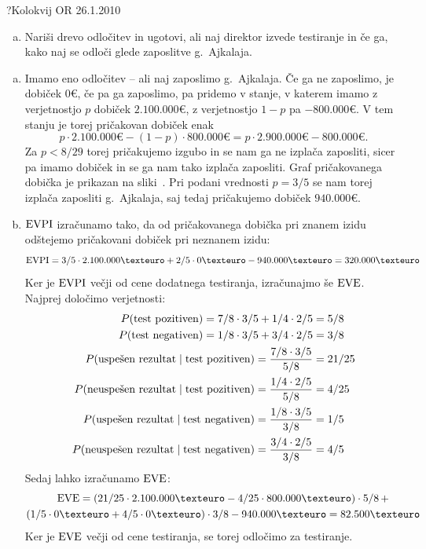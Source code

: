 \begin{naloga}{?}{Kolokvij OR 26.1.2010}
\begin{vprasanje}[ajkalaj]
\begin{enumerate}[(a)]
\item Nariši drevo odločitev in ugotovi,
ali naj direktor izvede testiranje in če ga,
kako naj se odloči glede zaposlitve g.~Ajkalaja.
\end{enumerate}
\end{vprasanje}

\begin{odgovor}
\begin{enumerate}[(a)]
\item Imamo eno odločitev -- ali naj zaposlimo g.~Ajkalaja.
Če ga ne zaposlimo, je dobiček $0 €$,
če pa ga zaposlimo, pa pridemo v stanje,
v katerem imamo z verjetnostjo $p$ dobiček $2.100.000 €$,
z verjetnostjo $1-p$ pa $-800.000 €$.
V tem stanju je torej pričakovan dobiček enak
$$
p \cdot 2.100.000 € - (1-p) \cdot 800.000 € =
p \cdot 2.900.000 € - 800.000 € .
$$
Za $p < 8/29$ torej pričakujemo izgubo in se nam ga ne izplača zaposliti,
sicer pa imamo dobiček in se ga nam tako izplača zaposliti.
Graf pričakovanega dobička je prikazan na sliki~.
Pri podani vrednosti $p = 3/5$ se nam torej izplača zaposliti g.~Ajkalaja,
saj tedaj pričakujemo dobiček $940.000 €$.

\item $\operatorname{EVPI}$ izračunamo tako,
da od pričakovanega dobička pri znanem izidu
odštejemo pričakovani dobiček pri neznanem izidu:
$$
\EVPI = 3/5 \cdot 2.100.000 € + 2/5 \cdot 0€ - 940.000 € = 320.000 €
$$
Ker je $\operatorname{EVPI}$ večji od cene dodatnega testiranja,
izračunajmo še $\operatorname{EVE}$.
Najprej določimo verjetnosti:
\begin{align*}
P(\text{test pozitiven}) = 7/8 \cdot 3/5 + 1/4 \cdot 2/5 &= 5/8 \\
P(\text{test negativen}) = 1/8 \cdot 3/5 + 3/4 \cdot 2/5 &= 3/8 \\
P(\text{uspešen rezultat} \;|\; \text{test pozitiven}) =
{7/8 \cdot 3/5 \over 5/8} &= 21/25 \\
P(\text{neuspešen rezultat} \;|\; \text{test pozitiven}) =
{1/4 \cdot 2/5 \over 5/8} &= 4/25 \\
P(\text{uspešen rezultat} \;|\; \text{test negativen}) =
{1/8 \cdot 3/5 \over 3/8} &= 1/5 \\
P(\text{neuspešen rezultat} \;|\; \text{test negativen}) =
{3/4 \cdot 2/5 \over 3/8} &= 4/5
\end{align*}
Sedaj lahko izračunamo $\operatorname{EVE}$:
\begin{multline*}
\EVE = (21/25 \cdot 2.100.000 € - 4/25 \cdot 800.000 €) \cdot 5/8 \, + \\
(1/5 \cdot 0 € + 4/5 \cdot 0 €) \cdot 3/8 - 940.000 € = 82.500 €
\end{multline*}
Ker je $\operatorname{EVE}$ večji od cene testiranja, se torej odločimo za testiranje.


\end{enumerate}
\end{odgovor}
\end{naloga}
